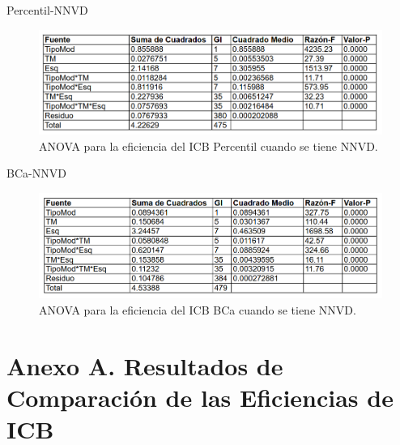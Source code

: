 
Percentil-NNVD

\begin{figure}[ht] 
	\centering 
	\includegraphics[width=0.95\linewidth]{img/ANOVA_Efic_ICB_Perc_NNVD.png} 
	\caption{ANOVA para la eficiencia del ICB Percentil cuando se tiene NNVD.} 
	\label{fig:ANOVA_Efic_ICB_Perc_NNVD}
\end{figure}
\FloatBarrier





BCa-NNVD

\begin{figure}[ht] 
	\centering 
	\includegraphics[width=0.95\linewidth]{img/ANOVA_Efic_ICB_BCa_NNVD.png} 
	\caption{ANOVA para la eficiencia del ICB BCa cuando se tiene NNVD.} 
	\label{fig:ANOVA_Efic_ICB_BCa_NNVD}
\end{figure}
\FloatBarrier


\newpage


\section*{Anexo A. Resultados de Comparación de las Eficiencias de ICB}






  